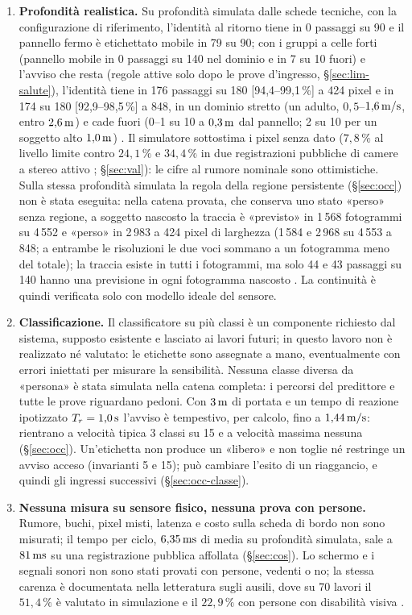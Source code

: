 \begin{enumerate}[label=\arabic*.,ref=\arabic*,leftmargin=1.8em]
\item \textbf{Profondità realistica.} Su profondità simulata dalle schede tecniche, con la configurazione di riferimento, l'identità al ritorno tiene in 0 passaggi su 90 e il pannello fermo è etichettato mobile in 79 su 90; con i gruppi a celle forti (pannello mobile in 0 passaggi su 140 nel dominio e in 7 su 10 fuori) e l'avviso che resta (regole attive solo dopo le prove d'ingresso, \S\ref{sec:lim-salute}), l'identità tiene in 176 passaggi su 180 [94,4--99,1\,\%] a 424 pixel e in 174 su 180 [92,9--98,5\,\%] a 848, in un dominio stretto (un adulto, $0{,}5$--$1{,}6\,\mathrm{m/s}$, entro $2{,}6\,\mathrm{m}$) e cade fuori (0--1 su 10 a $0{,}3\,\mathrm{m}$ dal pannello; 2 su 10 per un soggetto alto $1{,}0\,\mathrm{m}$) . Il simulatore sottostima i pixel senza dato ($7{,}8\,\%$ al livello limite contro $24{,}1\,\%$ e $34{,}4\,\%$ in due registrazioni pubbliche di camere a stereo attivo ; \S\ref{sec:val}): le cifre al rumore nominale sono ottimistiche. Sulla stessa profondità simulata la regola della regione persistente (\S\ref{sec:occ}) non è stata eseguita: nella catena provata, che conserva uno stato «perso» senza regione, a soggetto nascosto la traccia è «previsto» in 1\,568 fotogrammi su 4\,552 e «perso» in 2\,983 a 424 pixel di larghezza (1\,584 e 2\,968 su 4\,553 a 848; a entrambe le risoluzioni le due voci sommano a un fotogramma meno del totale); la traccia esiste in tutti i fotogrammi, ma solo 44 e 43 passaggi su 140 hanno una previsione in ogni fotogramma nascosto . La continuità è quindi verificata solo con modello ideale del sensore.
\item \textbf{Classificazione.} Il classificatore su più classi è un componente richiesto dal sistema, supposto esistente e lasciato ai lavori futuri; in questo lavoro non è realizzato né valutato: le etichette sono assegnate a mano, eventualmente con errori iniettati per misurare la sensibilità. Nessuna classe diversa da «persona» è stata simulata nella catena completa: i percorsi del predittore e tutte le prove riguardano pedoni. Con $3\,\mathrm{m}$ di portata e un tempo di reazione ipotizzato $T_r=1{,}0\,\mathrm{s}$ l'avviso è tempestivo, per calcolo, fino a $1{,}44\,\mathrm{m/s}$: rientrano a velocità tipica 3 classi su 15 e a velocità massima nessuna  (\S\ref{sec:occ}). Un'etichetta non produce un «libero» e non toglie né restringe un avviso acceso (invarianti 5 e 15); può cambiare l'esito di un riaggancio, e quindi gli ingressi successivi (\S\ref{sec:occ-classe}).
\item \textbf{Nessuna misura su sensore fisico, nessuna prova con persone.} Rumore, buchi, pixel misti, latenza e costo sulla scheda di bordo non sono misurati; il tempo per ciclo, $6{,}35\,\mathrm{ms}$ di media su profondità simulata, sale a $81\,\mathrm{ms}$ su una registrazione pubblica affollata  (\S\ref{sec:cos}). Lo schermo e i segnali sonori non sono stati provati con persone, vedenti o no; la stessa carenza è documentata nella letteratura sugli ausili, dove su 70 lavori il $51{,}4\,\%$ è valutato in simulazione e il $22{,}9\,\%$ con persone con disabilità visiva \cite{romlay2021}.
\end{enumerate}

